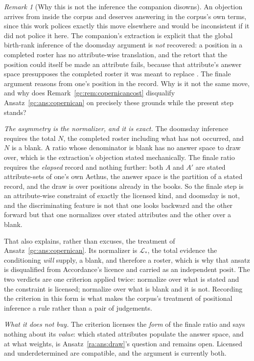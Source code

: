 \documentclass[11pt]{article}
\numberwithin{equation}{section}
\theoremstyle{plain}
\theoremstyle{definition}
\theoremstyle{remark}
\newtheorem{remark}[theorem]{Remark}
\newcommand{\Lc}{\mathcal{L}}
\begin{document}
\begin{remark}[Why this is not the inference the companion disowns]
\label{ra:rem:noroster}
An objection arrives from inside the corpus and deserves answering in
the corpus's own terms, since this work polices exactly this move
elsewhere and would be inconsistent if it did not police it here. The companion's extraction is explicit that the global birth-rank
inference of the doomsday argument \cite{Leslie96} is \emph{not} recovered: a position
in a completed roster has no attribute-wise translation, and the retort
that the position could itself be made an attribute fails, because that
attribute's answer space presupposes the completed roster it was meant
to replace \cite{NexicFoundation}. The finale argument reasons from
one's position in the record. Why is it not the same move, and why does
Remark~\ref{gc:rem:copernicancost} disqualify
Ansatz~\ref{gc:ans:copernican} on precisely these grounds while the
present step stands?

\emph{The asymmetry is the normalizer, and it is exact.} The doomsday
inference requires the total $N$, the completed roster including
what has not occurred, and $N$ is a blank. A ratio whose denominator
is blank has no answer space to draw over, which is the extraction's
objection stated mechanically. The finale ratio requires the
\emph{elapsed} record and nothing further: both $A$ and $A'$ are
stated attribute-sets of one's own Aethus, the answer space is the
partition of a stated record, and the draw is over positions already
in the books. So the finale step is an attribute-wise constraint of
exactly the licensed kind, and doomsday is not, and the discriminating
feature is not that one looks backward and the other forward but that
one normalizes over stated attributes and the other over a blank.

That also explains, rather than excuses, the treatment of
Ansatz~\ref{gc:ans:copernican}. Its normalizer is $\Lc_\ast$, the total
evidence the conditioning \emph{will} supply, a blank, and therefore
a roster, which is why that ansatz is disqualified from Accordance's
licence and carried as an independent posit. The two verdicts are one
criterion applied twice: normalize over what is stated and the
constraint is licensed; normalize over what is blank and it is not.
Recording the criterion in this form is what makes the corpus's
treatment of positional inference a rule rather than a pair of
judgements.

\emph{What it does not buy.} The criterion licenses the \emph{form} of
the finale ratio and says nothing about its \emph{value}: which stated
attributes populate the answer space, and at what weights, is
Ansatz~\ref{ra:ans:draw}'s question and remains open. Licensed and
underdetermined are compatible, and the argument is currently both.
\end{remark}
\end{document}
